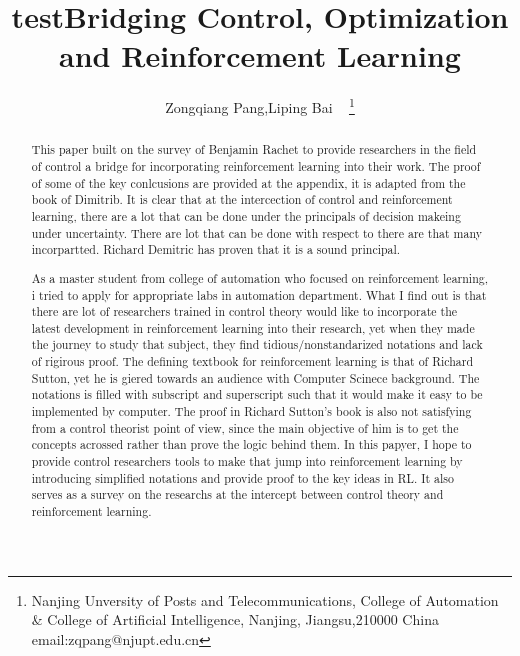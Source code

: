 \documentclass[journal]{IEEEtran}
\begin{document}
    \title{test}
\title{Bridging Control, Optimization and Reinforcement Learning}
\author{ Zongqiang Pang,Liping Bai ~ \thanks{Nanjing Unversity of Posts and Telecommunications, College of Automation \& College of Artificial Intelligence, Nanjing, Jiangsu,210000 China email:zqpang@njupt.edu.cn}}
\maketitle
\begin{abstract}

This paper built on the survey of Benjamin Rachet to provide researchers in the field of control a bridge for incorporating reinforcement learning into their work. The proof of some of the key conlcusions are provided at the appendix, it is adapted from the book of Dimitrib. It is clear that at the intercection of control and reinforcement learning, there are a lot that can be done under the principals of decision makeing under uncertainty. There are lot that can be done with respect to there are that many incorpartted. Richard Demitric has proven that it is a sound principal.





As a master student from college of automation who focused on reinforcement learning, i tried to apply for appropriate labs in automation department. What I find out is that there are lot of researchers trained in control theory would like to incorporate the latest development in reinforcement learning into their research, yet when they made the journey to study that subject, they find tidious/nonstandarized notations and lack of rigirous proof. The defining textbook for reinforcement learning is that of Richard Sutton, yet he is giered towards an audience with Computer Scinece background. The notations is filled with subscript and superscript such that it would make it easy to be implemented by computer. The proof in Richard Sutton's book is also not satisfying from a control theorist point of view, since the main objective of him is to get the concepts acrossed rather than prove the logic behind them. In this papyer, I hope to provide control researchers tools to make that jump into reinforcement learning by introducing simplified notations and provide proof to the key ideas in RL. It also serves as a survey on the researchs at the intercept between control theory and reinforcement learning.
\end{abstract}
\end{document}
